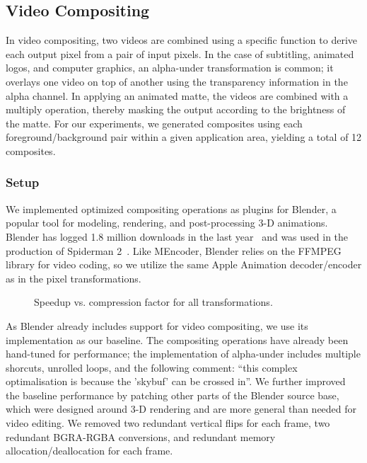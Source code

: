 \subsection{Video Compositing}

In video compositing, two videos are combined using a specific
function to derive each output pixel from a pair of input pixels.  In
the case of subtitling, animated logos, and computer graphics, an
alpha-under transformation is common; it overlays one video on top of
another using the transparency information in the alpha channel.  In
applying an animated matte, the videos are combined with a multiply
operation, thereby masking the output according to the brightness of
the matte.  For our experiments, we generated composites using each
foreground/background pair within a given application area, yielding a
total of 12 composites.

\subsubsection{Setup}

We implemented optimized compositing operations as plugins for
Blender, a popular tool for modeling, rendering, and post-processing
3-D animations.  Blender has logged 1.8 million downloads in the last
year~\cite{blender-stats} and was used in the production of Spiderman
2~\cite{blender-wikipedia}.  Like MEncoder, Blender relies on the
FFMPEG library for video coding, so we utilize the same Apple
Animation decoder/encoder as in the pixel transformations.

\begin{figure}[t]
\caption{Speedup vs. compression factor for all transformations.
\protect\label{fig:speedup-scatter}}
\end{figure}

As Blender already includes support for video compositing, we use its
implementation as our baseline.  The compositing operations have
already been hand-tuned for performance; the implementation of
alpha-under includes multiple shorcuts, unrolled loops, and the
following comment: ``this complex optimalisation is because the
'skybuf' can be crossed in''.  We further improved the baseline
performance by patching other parts of the Blender source base, which
were designed around 3-D rendering and are more general than needed
for video editing.  We removed two redundant vertical flips for each
frame, two redundant BGRA-RGBA conversions, and redundant memory
allocation/deallocation for each frame.

